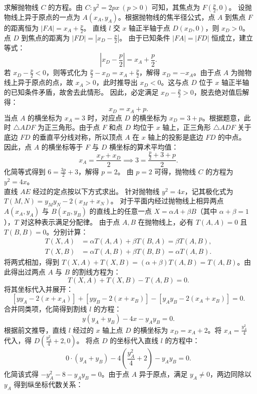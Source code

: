 \begin{solution}
求解抛物线 $C$ 的方程。由 $C: y^2 = 2px\ (p>0)$ 可知，其焦点为 $F\left(\frac{p}{2}, 0\right)$。
设抛物线上异于原点的一点为 $A(x_A, y_A)$。根据抛物线的焦半径公式，点 $A$ 到焦点 $F$ 的距离恒为 $|FA| = x_A + \frac{p}{2}$。
直线 $l$ 交 $x$ 轴正半轴于点 $D(x_D, 0)$，则 $x_D > 0$。点 $D$ 到焦点的距离为 $|FD| = \left|x_D - \frac{p}{2}\right|$。
由于已知条件 $|FA| = |FD|$ 恒成立，建立等式：
\[ \left|x_D - \frac{p}{2}\right| = x_A + \frac{p}{2}. \]
若 $x_D - \frac{p}{2} < 0$，则等式化为 $\frac{p}{2} - x_D = x_A + \frac{p}{2}$，解得 $x_D = -x_A$。由于点 $A$ 为抛物线上异于原点的点，故 $x_A > 0$，此时推导出 $x_D < 0$。这与点 $D$ 位于 $x$ 轴正半轴的已知条件矛盾，故舍去此情形。
因此，必定满足 $x_D - \frac{p}{2} > 0$，脱去绝对值后解得：
\[ x_D = x_A + p. \]
当点 $A$ 的横坐标为 $x_A = 3$ 时，对应点 $D$ 的横坐标为 $x_D = 3 + p$。根据题意，此时 $\triangle ADF$ 为正三角形。由于点 $F$ 和点 $D$ 均位于 $x$ 轴上，正三角形 $\triangle ADF$ 关于底边 $FD$ 的垂直平分线对称，所以顶点 $A$ 在 $x$ 轴上的投影是底边 $FD$ 的中点。
因此，点 $A$ 的横坐标等于 $F$ 与 $D$ 横坐标的算术平均值：
\[ x_A = \frac{x_F + x_D}{2} \implies 3 = \frac{\frac{p}{2} + 3 + p}{2}. \]
化简等式得到 $6 = \frac{3p}{2} + 3$，解得 $p = 2$。
由 $p=2$ 可得，抛物线 $C$ 的方程为 $y^2 = 4x$。\\
直线 $AE$ 经过的定点按以下方式求出。
针对抛物线 $y^2 = 4x$，记其极化式为 $T(M, N) = y_M y_N - 2(x_M + x_N)$。
对于平面内经过抛物线上相异两点 $A(x_A, y_A)$ 与 $B(x_B, y_B)$ 的直线上的任意一点 $X = \alpha A + \beta B$（其中 $\alpha + \beta = 1$），$T$ 对这种表示满足分配律。
由于点 $A, B$ 在抛物线上，必有 $T(A, A) = 0$ 且 $T(B, B) = 0$。分别计算：
\begin{align*}
T(X, A) &= \alpha T(A, A) + \beta T(B, A) = \beta T(A, B), \\
T(X, B) &= \alpha T(A, B) + \beta T(B, B) = \alpha T(A, B).
\end{align*}
将两式相加，得到 $T(X, A) + T(X, B) = (\alpha + \beta) T(A, B) = T(A, B)$。由此得出过两点 $A$ 与 $B$ 的割线方程为：
\[ T(X, A) + T(X, B) - T(A, B) = 0. \]
将其坐标代入并展开：
\[ [y y_A - 2(x + x_A)] + [y y_B - 2(x + x_B)] - [y_A y_B - 2(x_A + x_B)] = 0. \]
合并同类项，化简得到割线 $l$ 的方程：
\[ y(y_A + y_B) - 4x - y_A y_B = 0. \]
根据前文推导，直线 $l$ 经过的 $x$ 轴上点 $D$ 的横坐标为 $x_D = x_A + 2$。将 $x_A = \frac{y_A^2}{4}$ 代入，得 $D\left(\frac{y_A^2}{4} + 2, 0\right)$。
将点 $D$ 的坐标代入直线 $l$ 的方程中：
\[ 0 \cdot (y_A + y_B) - 4\left(\frac{y_A^2}{4} + 2\right) - y_A y_B = 0. \]
化简该式得 $-y_A^2 - 8 - y_A y_B = 0$。由于点 $A$ 异于原点，满足 $y_A \neq 0$，两边同除以 $y_A$ 得到纵坐标代数关系：

\end{solution}
